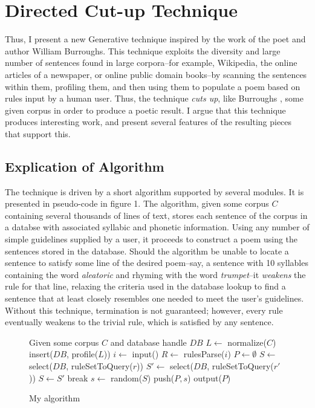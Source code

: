 \documentclass[10pt]{article}
\begin{document}
\section{Directed Cut-up Technique}
Thus, I present a new Generative technique inspired by the work of the poet and
author William Burroughs. This technique exploits the diversity and large
number of sentences found in large corpora--for example, Wikipedia, the online
articles of a newspaper, or online public domain books--by scanning the
sentences within them, profiling them, and then using them to populate a poem
based on rules input by a human user. Thus, the technique \emph{cuts up}, like
Burroughs \cite{wikiCutup}, some given corpus in order to produce a poetic
result. I argue that this technique produces interesting work, and present
several features of the resulting pieces that support this.

\subsection{Explication of Algorithm}
The technique is driven by a short algorithm  supported by several modules. It
is presented in pseudo-code in figure 1. The algorithm, given some corpus $C$
containing several thousands of lines of text, stores each sentence of the
corpus in a databse with associated syllabic and phonetic information. Using
any number of simple guidelines supplied by a user, it proceeds to construct a
poem using the sentences stored in the database. Should the algorithm be unable
to locate a sentence to satisfy some line of the desired poem--say, a sentence with
10 syllables containing the word \emph{aleatoric} and rhyming with the word
\emph{trumpet}--it \emph{weakens} the rule for that line, relaxing the criteria
used in the database lookup to find a sentence that at least closely resembles
one needed to meet the user's guidelines. Without this technique, termination
is not guaranteed; however, every rule eventually weakens to the trivial rule,
which is satisfied by any sentence.

\pagebreak
\onehalfspacing
\begin{figure}[here]
\begin{algorithmic}
\STATE Given some corpus $C$ and database handle $DB$
\STATE $L\gets$ normalize($C$)
\STATE insert($DB$, profile($L$))
\STATE $i \gets$ input()
\STATE $R \gets$ rulesParse($i$) 
\STATE $P \gets \emptyset$ 
    \STATE $S \gets$ select($DB$, ruleSetToQuery($r$))
            \STATE $S\prime \gets$ select($DB$, ruleSetToQuery($r\prime$))
                \STATE $S \gets S\prime$
                \STATE break
            \ENDIF
        \ENDWHILE
    \ENDIF
    \STATE $s \gets$ random($S$)
    \STATE push($P, s$)
\ENDFOR
\STATE output($P$)
\end{algorithmic}
\caption{My algorithm}
\label{fig:algorithm}
\end{figure}
\doublespacing
\end{document}
